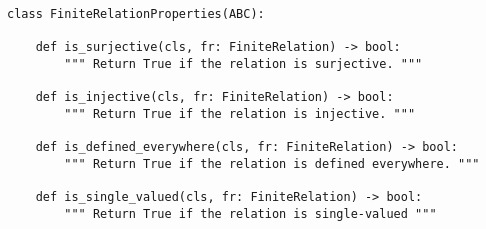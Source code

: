 \begin{verbatim}
class FiniteRelationProperties(ABC):

    def is_surjective(cls, fr: FiniteRelation) -> bool:
        """ Return True if the relation is surjective. """

    def is_injective(cls, fr: FiniteRelation) -> bool:
        """ Return True if the relation is injective. """

    def is_defined_everywhere(cls, fr: FiniteRelation) -> bool:
        """ Return True if the relation is defined everywhere. """

    def is_single_valued(cls, fr: FiniteRelation) -> bool:
        """ Return True if the relation is single-valued """
\end{verbatim}